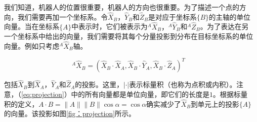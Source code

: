我们知道，机器人的位置很重要，机器人的方向也很重要。为了描述一个点的方向，我们需要再加一个坐标系。令$\hat{X}_B$，$\hat{Y}_B$和$\hat{Z}_B$是对应于坐标系$\{B\}$的主轴的单位向量。当在坐标系$\{A\}$中表示时，它们被表示为$^A\hat{X}_B，^A\hat{Y}_B$和$^A\hat{Z}_B$。为了表达在另一个坐标系中给出的向量，我们需要将其每个分量投影到分布在目标坐标系的单位向量。例如只考虑$^A\hat{X}_B$轴。

\begin{equation}\label{eq:projection}
^A\hat{X}_B=(\hat{X}_B\cdot\hat{X}_A, \hat{X}_B\cdot\hat{Y}_A,\hat{X}_B\cdot\hat{Z}_A)^T
\end{equation}


包括$\hat{X}_B$到$\hat{X}_A$，$\hat{Y}_A$和$\hat{Z}_A$的投影。这里，$|\cdot|$表示标量积（也称为点积或内积）。注意，（\ref{eq:projection}）中的所有向量都是单位向量，即它们的长度是$1$。根据标量积的定义，$ A\cdot B =\|A\|\|B\|\cos \alpha=\cos\alpha$确实减少了$\hat{X}_B$到单元上的投影$\{A\}$的向量。该投影如图\ref{fig：projection}所示。

